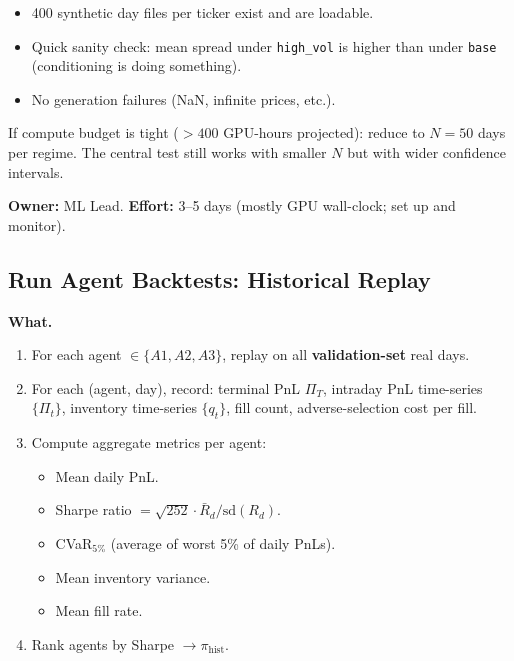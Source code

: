 \documentclass[11pt,a4paper]{article}
\begin{document}
\begin{successbox}
  \begin{itemize}[nosep]
    \item 400 synthetic day files per ticker exist and are loadable.
    \item Quick sanity check: mean spread under \texttt{high\_vol} is higher than under \texttt{base} (conditioning is doing something).
    \item No generation failures (NaN, infinite prices, etc.).
  \end{itemize}
\end{successbox}

\begin{warnbox}
  If compute budget is tight ($> 400$ GPU-hours projected): reduce to $N = 50$ days per regime.  The central test still works with smaller $N$ but with wider confidence intervals.
\end{warnbox}

\textbf{Owner:} ML Lead. \quad \textbf{Effort:} 3--5 days (mostly GPU wall-clock; set up and monitor).

\subsection{Run Agent Backtests: Historical Replay}

\textbf{What.}
\begin{enumerate}[nosep]
  \item For each agent $\in \{A1, A2, A3\}$, replay on all \textbf{validation-set} real days.
  \item For each (agent, day), record: terminal PnL $\Pi_T$, intraday PnL time-series $\{\Pi_t\}$, inventory time-series $\{q_t\}$, fill count, adverse-selection cost per fill.
  \item Compute aggregate metrics per agent:
    \begin{itemize}[nosep]
      \item Mean daily PnL.
      \item Sharpe ratio $= \sqrt{252} \cdot \bar{R}_d / \text{sd}(R_d)$.
      \item CVaR$_{5\%}$ (average of worst 5\% of daily PnLs).
      \item Mean inventory variance.
      \item Mean fill rate.
    \end{itemize}
  \item Rank agents by Sharpe $\to \pi_{\text{hist}}$.
\end{enumerate}
\end{document}
